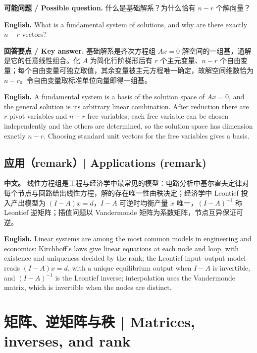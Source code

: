 \documentclass[UTF8,11pt,a4paper]{ctexart}
\newcommand{\EN}[1]{\par\noindent\textbf{English.} #1\par}
\newcommand{\ASK}[4]{\par\noindent\textbf{可能问题 / Possible question.} #1\par\EN{#2}\noindent\textbf{回答要点 / Key answer.} #3\par\EN{#4}\medskip}
\newcommand{\APS}[2]{\par\noindent\textbf{中文。} #1\par\noindent\textbf{English.} #2\par\smallskip}
\begin{document}
\ASK{什么是基础解系？为什么恰有 $n-r$ 个解向量？}{What is a fundamental system of solutions, and why are there exactly $n-r$ vectors?}{基础解系是齐次方程组 $Ax=0$ 解空间的一组基，通解是它的任意线性组合。化 $A$ 为简化行阶梯形后有 $r$ 个主元变量、$n-r$ 个自由变量；每个自由变量可独立取值，其余变量被主元方程唯一确定，故解空间维数恰为 $n-r$。令自由变量取标准单位向量即得一组基。}{A fundamental system is a basis of the solution space of $Ax=0$, and the general solution is its arbitrary linear combination. After reduction there are $r$ pivot variables and $n-r$ free variables; each free variable can be chosen independently and the others are determined, so the solution space has dimension exactly $n-r$. Choosing standard unit vectors for the free variables gives a basis.}

\subsection{应用（remark）| Applications (remark)}
\APS{线性方程组是工程与经济学中最常见的模型：电路分析中基尔霍夫定律对每个节点与回路给出线性方程，解的存在唯一性由秩决定；经济学中 Leontief 投入产出模型为 $(I-A)x=d$，$I-A$ 可逆时均衡产量 $x$ 唯一，$(I-A)^{-1}$ 称 Leontief 逆矩阵；插值问题以 Vandermonde 矩阵为系数矩阵，节点互异保证可逆。}{Linear systems are among the most common models in engineering and economics: Kirchhoff's laws give linear equations at each node and loop, with existence and uniqueness decided by the rank; the Leontief input--output model reads $(I-A)x=d$, with a unique equilibrium output when $I-A$ is invertible, and $(I-A)^{-1}$ is the Leontief inverse; interpolation uses the Vandermonde matrix, which is invertible when the nodes are distinct.}

\section{矩阵、逆矩阵与秩 | Matrices, inverses, and rank}
\end{document}
